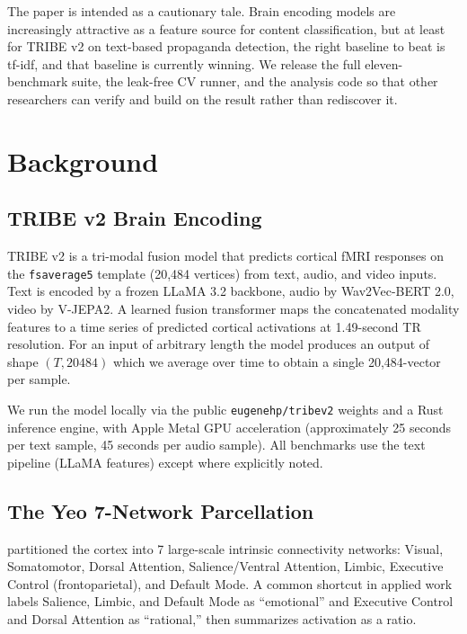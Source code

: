 \documentclass[11pt]{article}
\begin{document}
The paper is intended as a cautionary tale. Brain encoding models are increasingly attractive as a feature source for content classification, but at least for TRIBE v2 on text-based propaganda detection, the right baseline to beat is tf-idf, and that baseline is currently winning. We release the full eleven-benchmark suite, the leak-free CV runner, and the analysis code so that other researchers can verify and build on the result rather than rediscover it.

\section{Background}

\subsection{TRIBE v2 Brain Encoding}

TRIBE v2 \cite{dascoli2026tribev2} is a tri-modal fusion model that predicts cortical fMRI responses on the \texttt{fsaverage5} template (20{,}484 vertices) from text, audio, and video inputs. Text is encoded by a frozen LLaMA 3.2 backbone, audio by Wav2Vec-BERT 2.0, video by V-JEPA2. A learned fusion transformer maps the concatenated modality features to a time series of predicted cortical activations at 1.49-second TR resolution. For an input of arbitrary length the model produces an output of shape $(T, 20484)$ which we average over time to obtain a single 20{,}484-vector per sample.

We run the model locally via the public \texttt{eugenehp/tribev2} weights and a Rust inference engine, with Apple Metal GPU acceleration (approximately 25 seconds per text sample, 45 seconds per audio sample). All benchmarks use the text pipeline (LLaMA features) except where explicitly noted.

\subsection{The Yeo 7-Network Parcellation}

\citet{yeo2011organization} partitioned the cortex into 7 large-scale intrinsic connectivity networks: Visual, Somatomotor, Dorsal Attention, Salience/Ventral Attention, Limbic, Executive Control (frontoparietal), and Default Mode. A common shortcut in applied work labels Salience, Limbic, and Default Mode as ``emotional'' and Executive Control and Dorsal Attention as ``rational,'' then summarizes activation as a ratio.
\end{document}
